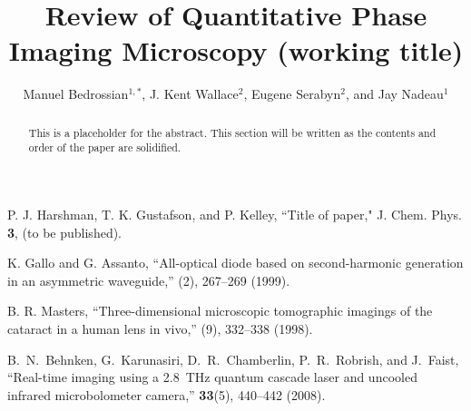 \documentclass[10pt,letterpaper]{article}
\begin{document}
\title{Review of Quantitative Phase Imaging Microscopy (working title)}

\author{Manuel Bedrossian$^{1,*}$, J. Kent Wallace$^{2}$, Eugene Serabyn$^2$, and Jay Nadeau$^1$}

\address{$^1$Division of Aerospace Engineering, California Institute of Technology, 1200 E. California Blvd., Pasadena CA 91125, USA\\
$^2$Jet Propulsion Laboratory, California Institute of Technology, 4800 Oak Grove Dr., Pasadena, CA. 91109, USA}




\begin{abstract}
This is a placeholder for the abstract. This section will be written as the contents and order of the paper are solidified.
\end{abstract}


\begin{thebibliography}{99}
P. J. Harshman, T. K. Gustafson, and P. Kelley, ``Title of paper," J. Chem. Phys. {\bf 3}, (to be published).

 K. Gallo and G. Assanto, ``All-optical diode based on second-harmonic generation in an asymmetric waveguide,'' (2), 267--269 (1999).

 B. R. Masters, ``Three-dimensional microscopic tomographic imagings of the cataract in a human lens in vivo,'' (9), 332--338 (1998).


B.~N.~Behnken, G.~Karunasiri, D.~R.~Chamberlin, P.~R.~Robrish, and J.~Faist,
``Real-time imaging using a 2.8~THz quantum cascade laser and uncooled infrared microbolometer camera,''
\ol \textbf{33}(5), 440--442 (2008).

\end{thebibliography}
\end{document}
